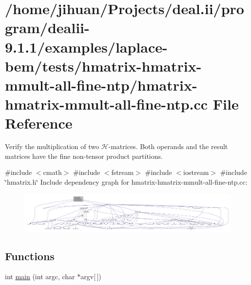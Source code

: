 \hypertarget{hmatrix-hmatrix-mmult-all-fine-ntp_8cc}{}\section{/home/jihuan/\+Projects/deal.ii/program/dealii-\/9.1.1/examples/laplace-\/bem/tests/hmatrix-\/hmatrix-\/mmult-\/all-\/fine-\/ntp/hmatrix-\/hmatrix-\/mmult-\/all-\/fine-\/ntp.cc File Reference}
\label{hmatrix-hmatrix-mmult-all-fine-ntp_8cc}


Verify the multiplication of two $\mathcal{H}$-\/matrices. Both operands and the result matrices have the fine non-\/tensor product partitions.  


{\ttfamily \#include $<$cmath$>$}\newline
{\ttfamily \#include $<$fstream$>$}\newline
{\ttfamily \#include $<$iostream$>$}\newline
{\ttfamily \#include \char`\"{}hmatrix.\+h\char`\"{}}\newline
Include dependency graph for hmatrix-\/hmatrix-\/mmult-\/all-\/fine-\/ntp.cc\+:
\nopagebreak
\begin{figure}[H]
\begin{center}
\leavevmode
\includegraphics[width=350pt]{hmatrix-hmatrix-mmult-all-fine-ntp_8cc__incl}
\end{center}
\end{figure}
\subsection*{Functions}
\begin{DoxyCompactItemize}
\item 
int \hyperlink{hmatrix-hmatrix-mmult-all-fine-ntp_8cc_a0ddf1224851353fc92bfbff6f499fa97}{main} (int argc, char $\ast$argv\mbox{[}$\,$\mbox{]})
\end{DoxyCompactItemize}


